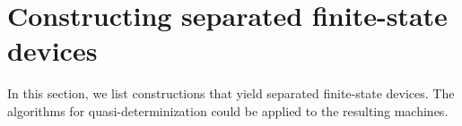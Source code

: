 \section{Constructing separated finite-state devices}

In this section, we list constructions that yield separated finite-state devices.
The algorithms for quasi-determinization could be applied to the resulting machines.



